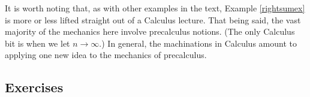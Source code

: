 It is worth noting that, as with other examples in the text,  Example \ref{rightsumex} is more or less lifted straight out of  a Calculus lecture.  That being said, the vast majority of the mechanics here involve precalculus notions. (The only Calculus bit is when we let $n \rightarrow \infty$.)   In general, the machinations in Calculus amount to applying one new idea to the mechanics of precalculus.  

\newpage

\subsection{Exercises}




\closegraphsfile